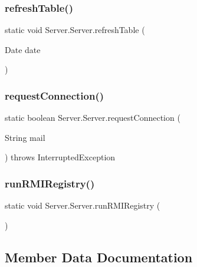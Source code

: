\subsubsection{refresh\+Table()}
{\footnotesize\ttfamily static void Server.\+Server.\+refresh\+Table (\begin{DoxyParamCaption}\item[{Date}]{date }\end{DoxyParamCaption})\hspace{0.3cm}{\ttfamily [static]}}

\mbox{\label{class_server_1_1_server_a33cac3bfc04d6df935863735bc37bef0}} 
\subsubsection{request\+Connection()}
{\footnotesize\ttfamily static boolean Server.\+Server.\+request\+Connection (\begin{DoxyParamCaption}\item[{String}]{mail }\end{DoxyParamCaption}) throws Interrupted\+Exception\hspace{0.3cm}{\ttfamily [static]}}

\mbox{\label{class_server_1_1_server_a8ea50583e41c4ca2ebce7cf7f3ca01f6}} 
\subsubsection{run\+R\+M\+I\+Registry()}
{\footnotesize\ttfamily static void Server.\+Server.\+run\+R\+M\+I\+Registry (\begin{DoxyParamCaption}{ }\end{DoxyParamCaption})\hspace{0.3cm}{\ttfamily [static]}}



\subsection{Member Data Documentation}
\mbox{\label{class_server_1_1_server_ab198ffe1451eba7351d790a12deb5199}} 
